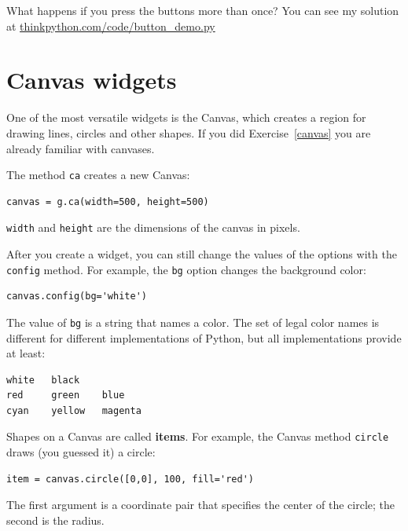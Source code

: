 \documentclass[10pt]{book}
\begin{document}
{\begin{ex}
What happens if you press the buttons more than once?
You can see my solution at \url{thinkpython.com/code/button_demo.py}

\end{ex}


\section{Canvas widgets}


One of the most versatile widgets is the Canvas, which creates
a region for drawing lines, circles and other shapes.  If you
did Exercise~\ref{canvas} you are already familiar with canvases.

The method {\tt ca} creates a new Canvas:

\beforeverb
\begin{verbatim}
canvas = g.ca(width=500, height=500)
\end{verbatim}
\afterverb
%
{\tt width} and {\tt height} are the dimensions of the canvas
in pixels.  


After you create a widget, you can still change the values of
the options with the
{\tt config} method.  For example, the {\tt bg} option changes
the background color:

\beforeverb
\begin{verbatim}
canvas.config(bg='white')
\end{verbatim}
\afterverb
%
The value of {\tt bg} is a string
that names a color.  The set of legal color names is different
for different implementations of Python, but all implementations
provide at least:

\beforeverb
\begin{verbatim}
white   black
red     green    blue   
cyan    yellow   magenta
\end{verbatim}
\afterverb
%
Shapes on a Canvas are called {\bf items}.  For example,
the Canvas method {\tt circle} draws (you guessed it) a circle:


\beforeverb
\begin{verbatim}
item = canvas.circle([0,0], 100, fill='red')
\end{verbatim}
\afterverb
%
The first argument is a coordinate pair that specifies the
center of the circle; the second is the radius.

}
\end{document}
